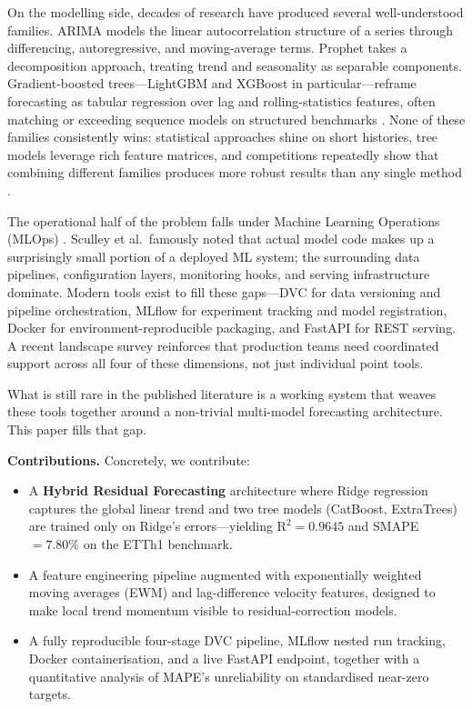 \documentclass[conference]{IEEEtran}
\begin{document}
  On the modelling side, decades of research have produced several well-understood
  families. ARIMA \cite{box2015time} models the linear autocorrelation structure of a
  series through differencing, autoregressive, and moving-average terms. Prophet
  \cite{taylor2018prophet} takes a decomposition approach, treating trend and
  seasonality as separable components. Gradient-boosted trees---LightGBM
  \cite{ke2017lightgbm} and XGBoost \cite{chen2016xgboost} in particular---reframe
  forecasting as tabular regression over lag and rolling-statistics features,
  often matching or exceeding sequence models on structured benchmarks
  \cite{hewamalage2021recurrent, januschowski2022forecasting}. None of these families
  consistently wins: statistical approaches shine on short histories, tree models
  leverage rich feature matrices, and competitions repeatedly show that combining
  different families produces more robust results than any single method
  \cite{makridakis2018m4, makridakis2022m5}.

  The operational half of the problem falls under Machine Learning Operations (MLOps)
  \cite{sculley2015hidden, kreuzberger2023mlops}. Sculley et al.\ famously noted that
  actual model code makes up a surprisingly small portion of a deployed ML system; the
  surrounding data pipelines, configuration layers, monitoring hooks, and serving
  infrastructure dominate. Modern tools exist to fill these gaps---DVC \cite{dvc2020}
  for data versioning and pipeline orchestration, MLflow \cite{mlflow2018} for
  experiment tracking and model registration, Docker \cite{docker2013} for
  environment-reproducible packaging, and FastAPI \cite{fastapi2018} for REST serving.
  A recent landscape survey \cite{berberi2025mlops} reinforces that production teams
  need coordinated support across all four of these dimensions, not just individual
  point tools.

  What is still rare in the published literature is a working system that weaves these
  tools together around a non-trivial multi-model forecasting architecture. This paper
  fills that gap.

  \textbf{Contributions.} Concretely, we contribute:
  \begin{itemize}
    \item A \textbf{Hybrid Residual Forecasting} architecture where Ridge regression
      captures the global linear trend and two tree models (CatBoost, ExtraTrees) are
      trained only on Ridge's errors---yielding $\text{R}^{2}=0.9645$ and
      SMAPE\,$=7.80\%$ on the ETTh1 benchmark.

    \item A feature engineering pipeline augmented with exponentially weighted moving
      averages (EWM) and lag-difference velocity features, designed to make local trend
      momentum visible to residual-correction models.

    \item A fully reproducible four-stage DVC pipeline, MLflow nested run tracking,
      Docker containerisation, and a live FastAPI endpoint, together with a
      quantitative analysis of MAPE's unreliability on standardised near-zero targets.
  \end{itemize}
\end{document}
